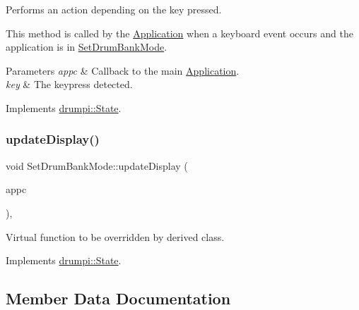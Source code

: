 Performs an action depending on the key pressed. 

This method is called by the \hyperlink{classdrumpi_1_1Application}{Application} when a keyboard event occurs and the application is in \hyperlink{classdrumpi_1_1SetDrumBankMode}{Set\+Drum\+Bank\+Mode}. 
\begin{DoxyParams}{Parameters}
{\em appc} & Callback to the main \hyperlink{classdrumpi_1_1Application}{Application}. \\
\hline
{\em key} & The keypress detected. \\
\hline
\end{DoxyParams}


Implements \hyperlink{classdrumpi_1_1State_aaa6205d85513b3f717c126e0717e1dbd}{drumpi\+::\+State}.

\mbox{\label{classdrumpi_1_1SetDrumBankMode_ae2f14f230923c5e0c19c780c59328822}} 
\subsubsection{\texorpdfstring{update\+Display()}{updateDisplay()}}
{\footnotesize\ttfamily void Set\+Drum\+Bank\+Mode\+::update\+Display (\begin{DoxyParamCaption}\item[{\hyperlink{classdrumpi_1_1ApplicationCallback}{Application\+Callback} $\ast$}]{appc }\end{DoxyParamCaption})\hspace{0.3cm}{\ttfamily [override]}, {\ttfamily [virtual]}}

Virtual function to be overridden by derived class. 

Implements \hyperlink{classdrumpi_1_1State_a400c5fc605ddec1e4fe18c361bf38ef2}{drumpi\+::\+State}.



\subsection{Member Data Documentation}
\mbox{\label{classdrumpi_1_1SetDrumBankMode_addef3a7e0513df0ddf7c8d335380d4c7}} 
